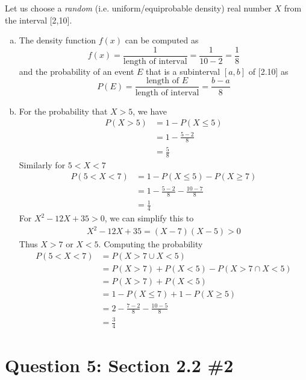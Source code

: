 \documentclass[11pt, oneside]{article}   	%
\begin{document}
Let us choose a \textit{random} (i.e. uniform/equiprobable density) real number $X$ from the interval [2,10].
\begin{enumerate}[(a)]
	\item The density function $f(x)$ can be computed as
	$$f(x) = \frac{1}{\text{length of interval}} = \frac{1}{10-2} = \frac{1}{8}$$
	and the probability of an event $E$ that is a subinterval $[a,b]$ of [2.10] as
	$$P(E) = \frac{\text{length of } E}{\text{length of interval}} = \frac{b-a}{8}$$
	
	\item For the probability that $X>5$, we have
	\begin{align*}
		P(X>5) & = 1 - P(X \leq 5) \\
		& = 1 - \frac{5-2}{8} \\
		& = \frac{5}{8}
	\end{align*}
	Similarly for $5 < X < 7$
	\begin{align*}
		P(5 < X < 7) & = 1 - P(X \leq 5) - P(X \geq 7) \\
		& = 1 - \frac{5-2}{8} - \frac{10-7}{8} \\
		& = \frac{1}{4}
	\end{align*}
	For $X^2-12X+35>0$, we can simplify this to
	\begin{align*}
		X^2-12X+35 = (X-7)(X-5) > 0
	\end{align*}
	Thus $X>7$ or $X<5$. Computing the probability
	\begin{align*}
		P(5 < X < 7) & = P(X > 7 \cup X <5) \\
		& = P(X > 7) + P(X<5) - P(X> 7 \cap X < 5) \\
		& = P(X > 7) + P(X<5) \\
		& = 1 - P(X \leq 7) + 1 - P(X \geq 5) \\
		& = 2 - \frac{7-2}{8} - \frac{10-5}{8} \\
		& = \frac{3}{4}
	\end{align*}
\end{enumerate}


\section*{Question 5: Section 2.2 \#2}
\end{document}
